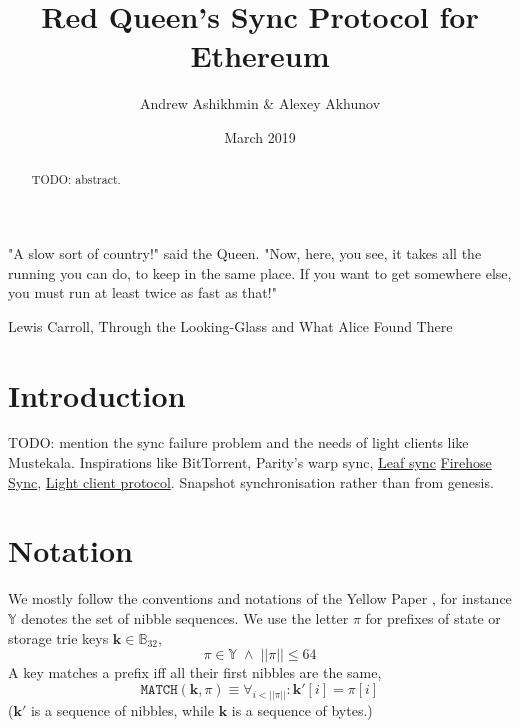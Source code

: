 \documentclass{amsart}
\begin{document}
\title{Red Queen's Sync Protocol for Ethereum}
\author{Andrew Ashikhmin \& Alexey Akhunov}
\date{March 2019}

\begin{abstract}
TODO: abstract.
\end{abstract}

\maketitle

\epigraph{
    "A slow sort of country!" said the Queen.
    "Now, here, you see, it takes all the running you can do, to keep in the same place.
    If you want to get somewhere else, you must run at least twice as fast as that!"
    }{Lewis Carroll, Through the Looking-Glass and What Alice Found There}

\section{Introduction}
TODO: mention the sync failure problem \cite{akhunov_1x_workshop_part1} and the needs of light clients like Mustekala.
Inspirations like BitTorrent, Parity's warp sync,
\href{https://notes.ethereum.org/kphcc_CKT4a5sUs_zWVelA}{Leaf sync}
\href{https://notes.ethereum.org/eXnqtO_vQquzrFDPHjuaFQ}{Firehose Sync},
\href{https://github.com/ethereum/wiki/wiki/Light-client-protocol}{Light client protocol}.
Snapshot synchronisation rather than from genesis.


\section{Notation}
We mostly follow the conventions and notations of the Yellow Paper \cite{yellow_paper},
for instance $\mathbb{Y}$ denotes the set of nibble sequences.
We use the letter $\pi$ for prefixes of state or storage trie keys $\mathbf{k} \in \mathbb{B}_{32}$,
\begin{equation}
    \pi \in \mathbb{Y} \; \land \; ||\pi|| \leq 64
\end{equation}
A key matches a prefix iff all their first nibbles are the same,
\begin{equation}
    \texttt{MATCH}(\mathbf{k}, \pi) \equiv \forall_{i < ||\pi||}: \mathbf{k}'[i] = \pi[i]
\end{equation}
($\mathbf{k}'$ is a sequence of nibbles, while $\mathbf{k}$ is a sequence of bytes.)
\end{document}
